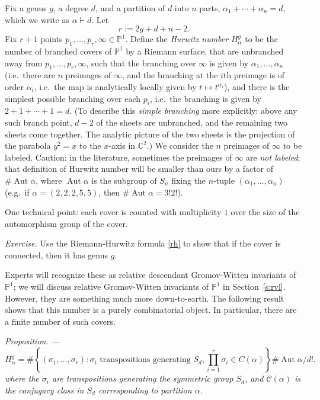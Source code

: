 \documentclass[12pt,letterpaper]{amsart}
\newcommand{\tpoint}[1]{\vspace{3mm}\par \noindent \refstepcounter{subsection}{\bf \thesubsection.} 
  {\em #1. ---} }
\newcommand{\C}{\mathbb{C}}
\newcommand{\proj}{\mathbb P}
\newcommand{\cC}{{\mathcal{C}}}
\newcommand{\al}{\alpha}
\newcommand{\si}{\sigma}
\newcommand{\Aut}{\operatorname{Aut}}
\newcommand{\lremind}[1]{{\bf[label:  #1]}}
\renewcommand{\lremind}[1]{{}}
\begin{document}
{Fix a genus $g$, a degree $d$, and a partition of $d$ into $n$ parts,
$\al_1 + \cdots + \al_n=d$, which we write as $\al \vdash d$.  Let\lremind{Hr}
\begin{equation}
r:=2g+d+n-2.\label{Hr}
\end{equation}  Fix $r+1$ points $p_1, \dots, p_r, \infty \in \proj^1$.
Define the {\em Hurwitz number} $H^g_{\al}$ to be the number of branched covers of $\proj^1$ by
a Riemann surface, that are unbranched away from $p_1, \dots, p_r,
\infty$, such that the branching over $\infty$ is given by $\al_1,
\dots, \al_n$ (i.e.\ there are $n$ preimages of $\infty$, and the
branching at the $i$th preimage is of order $\al_i$, i.e.\ the map is
analytically locally given by $t \mapsto t^{\al_i}$), and there is the
simplest possible branching over each $p_i$, i.e.\ the branching is
given by $2+1+\cdots+1=d$. 
(To describe this {\em simple branching} more explicitly:
above any such branch point, $d-2$ of the sheets are unbranched, and the remaining two sheets come together.  The analytic picture of the two sheets is the projection
of the parabola $y^2=x$ to the $x$-axis in $\C^2$.)
We consider the $n$ preimages of $\infty$
to be labeled.  Caution: in the literature, sometimes the preimages of
$\infty$ are {\em not labeled}; that definition of Hurwitz number will
be smaller than ours by a factor of $\# \Aut \al$, where $\Aut \al$ is
the subgroup of $S_n$ fixing the $n$-tuple $(\al_1, \dots, \al_n)$ (e.g.\ if $\al =
(2,2,2,5,5)$, then $\# \Aut \al = 3! 2!$).

One technical point:  each cover is counted with multiplicity
$1$ over the size of the automorphism group of the cover.

\noindent
{\em Exercise.}  Use the Riemann-Hurwitz formula \eqref{rh} to show
that if the cover is connected, then it has genus $g$.

Experts will recognize these as relative descendant Gromov-Witten
invariants of $\proj^1$; we will discuss relative Gromov-Witten
invariants of $\proj^1$ in Section~\ref{s:rvl}.  However, they are
something much more down-to-earth.  The following result shows that
this number is a purely combinatorial object.  In particular, there
are a finite number of such covers.

\tpoint{Proposition}
{\em 
$$H^g_{\al} = \# \left\{ (\si_1, \dots, \si_r) : \si_i \text{ transpositions generating
  $S_d$}, \prod_{i=1}^r \si_i \in C(\al) \right\} \# \Aut \al / d!,$$ where the
$\si_i$ are transpositions generating the symmetric group $S_d$, and
$\cC(\al)$ is the conjugacy class in $S_d$ corresponding to partition
$\al$.  } \label{hc}\lremind{hc}

}
\end{document}
